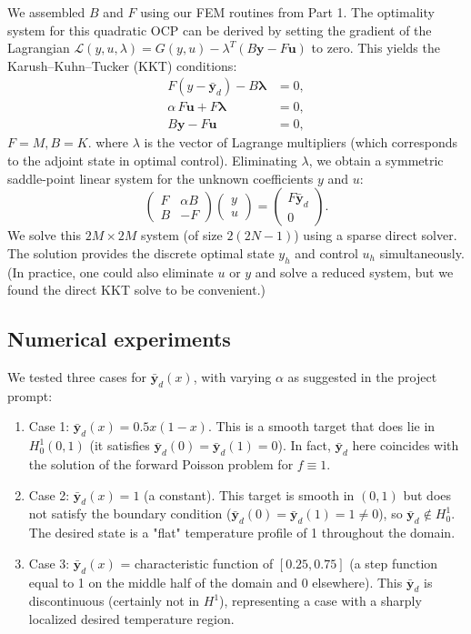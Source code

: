 We assembled $B$ and $F$ using our FEM routines from Part 1. The optimality system for this quadratic OCP can be derived by setting the gradient of the Lagrangian $\mathcal{L}(y,u,\lambda) = G(y,u) - \lambda^T(B\mathbf{y} - F\mathbf{u})$ to zero. This yields the Karush–Kuhn–Tucker (KKT) conditions:
\begin{align*}
	F(y-\bar{\mathbf{y}}_d) - B\symbf{\lambda}   & = 0, \\
	\alpha\,F\mathbf{u} + F\symbf{\lambda} & = 0, \\
	B\mathbf{y}-F\mathbf{u}                 & = 0,
\end{align*}
$F = M, B = K$.
where $\lambda$ is the vector of Lagrange multipliers (which corresponds to the adjoint state in optimal control). Eliminating $\lambda$, we obtain a symmetric saddle-point linear system for the unknown coefficients $y$ and $u$:
\[
	\begin{pmatrix}
		F & \alpha B \\
		B & -F
	\end{pmatrix}
	\begin{pmatrix}
		y \\
		u
	\end{pmatrix}
	=
	\begin{pmatrix}
		F\bar{\mathbf{y}}_d \\
		0
	\end{pmatrix}.
\]
We solve this $2M \times 2M$ system (of size $2(2N-1)$) using a sparse direct solver. The solution provides the discrete optimal state $y_h$ and control $u_h$ simultaneously. (In practice, one could also eliminate $u$ or $y$ and solve a reduced system, but we found the direct KKT solve to be convenient.)

\subsection{Numerical experiments} We tested three cases for $\bar{\mathbf{y}}_d(x)$, with varying $\alpha$ as suggested in the project prompt:

\begin{enumerate}
	\item Case 1: $\bar{\mathbf{y}}_d(x) = 0.5x(1-x)$. This is a smooth target that does lie in $H^1_0(0,1)$ (it satisfies $\bar{\mathbf{y}}_d(0)=\bar{\mathbf{y}}_d(1)=0$). In fact, $\bar{\mathbf{y}}_d$ here coincides with the solution of the forward Poisson problem for $f\equiv 1$.
	\item Case 2: $\bar{\mathbf{y}}_d(x) = 1$ (a constant). This target is smooth in $(0,1)$ but does not satisfy the boundary condition ($\bar{\mathbf{y}}_d(0)=\bar{\mathbf{y}}_d(1)=1\neq0$), so $\bar{\mathbf{y}}_d\notin H^1_0$. The desired state is a "flat" temperature profile of 1 throughout the domain.
	\item Case 3: $\bar{\mathbf{y}}_d(x)$ = characteristic function of $[0.25,0.75]$ (a step function equal to 1 on the middle half of the domain and 0 elsewhere). This $\bar{\mathbf{y}}_d$ is discontinuous (certainly not in $H^1$), representing a case with a sharply localized desired temperature region.
\end{enumerate}

